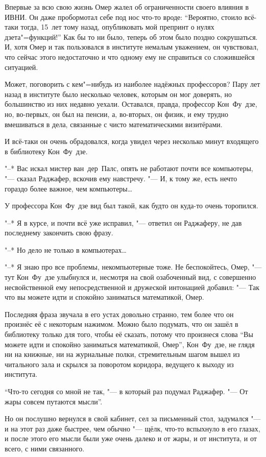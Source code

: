 Впервые за всю свою жизнь Омер жалел об ограниченности своего влияния в ИВНИ.
Он даже пробормотал себе под нос что-то вроде: \enquote{Вероятно, стоило всё-таки
тогда, 15~лет тому назад, опубликовать мой препринт о нулях дзета"=функций!}
Как бы то ни было, теперь об этом было поздно сокрушаться.
И, хотя Омер и так пользовался в институте немалым уважением, он чувствовал,
что сейчас этого недостаточно и что одному ему не справиться со сложившейся
ситуацией.

Может, поговорить с кем"=нибудь из наиболее надёжных профессоров?
Пару лет назад в институте было несколько человек, которым он мог доверять, но
большинство из них недавно уехали.
Оставался, правда, профессор Кон~Фу~дзе, но, во-первых, он был на пенсии, а,
во-вторых, он физик, и ему трудно вмешиваться в дела, связанные с чисто
математическими визитёрами.

И всё-таки он очень обрадовался, когда увидел через несколько минут входящего в
библиотеку Кон~Фу~дзе.

"--* Вас искал мистер ван~дер~Палс, опять не работают почти все компьютеры,
"--- сказал Раджафер, вскочив ему навстречу.
"--- И, к тому же, есть нечто гораздо более важное, чем компьютеры\ldots

У профессора Кон~Фу~дзе вид был такой, как будто он куда-то очень торопился.

"--* Я в курсе, и почти всё уже исправил, "--- ответил он Раджаферу, не дав
последнему закончить свою фразу.

"--* Но дело не только в компьютерах\ldots

"--* Я знаю про все проблемы, некомпьютерные тоже.
Не беспокойтесь, Омер, "--- тут Кон~Фу~дзе улыбнулся и, несмотря на свой
озабоченный вид, с совершенно несвойственной ему непосредственной и дружеской
интонацией добавил: "--- Так что вы можете идти и спокойно заниматься
математикой, Омер.

Последняя фраза звучала в его устах довольно странно, тем более что он произнёс
её с некоторым нажимом. Можно было подумать, что он зашёл в библиотеку только
для того, чтобы её сказать, потому что произнеся слова \enquote{Вы можете идти и
спокойно заниматься математикой, Омер}, Кон~Фу~дзе, не глядя ни на книжные, ни
на журнальные полки, стремительным шагом вышел из читального зала и скрылся за
поворотом коридора, ведущего к выходу из института.

\enquote{Что-то сегодня со мной не так, "--- в который раз подумал Раджафер.
"--- От жары совсем путаются мысли}.

Но он послушно вернулся в свой кабинет, сел за письменный стол, задумался "---
и на этот раз даже быстрее, чем обычно "--- щёлк, что-то вспыхнуло в его глазах,
и после этого его мысли были уже очень далеко и от жары, и от института, и от
всего, с ними связанного.
